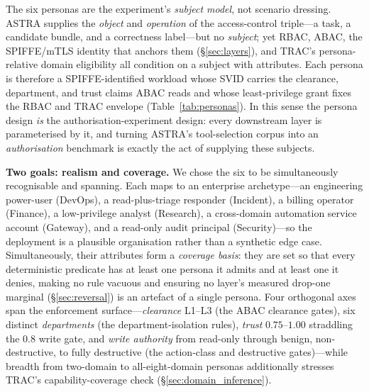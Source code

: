 \documentclass[sigconf,review,anonymous]{acmart}
\begin{document}
The six personas are the experiment's \emph{subject model}, not scenario dressing. ASTRA supplies the \emph{object} and \emph{operation} of the access-control triple---a task, a candidate bundle, and a correctness label---but no \emph{subject}; yet RBAC, ABAC, the SPIFFE/mTLS identity that anchors them (\S\ref{sec:layers}), and TRAC's persona-relative domain eligibility all condition on a subject with attributes. Each persona is therefore a SPIFFE-identified workload whose SVID carries the clearance, department, and trust claims ABAC reads and whose least-privilege grant fixes the RBAC and TRAC envelope (Table~\ref{tab:personas}). In this sense the persona design \emph{is} the authorisation-experiment design: every downstream layer is parameterised by it, and turning ASTRA's tool-selection corpus into an \emph{authorisation} benchmark is exactly the act of supplying these subjects.

\textbf{Two goals: realism and coverage.} We chose the six to be simultaneously recognisable and spanning. Each maps to an enterprise archetype---an engineering power-user (DevOps), a read-plus-triage responder (Incident), a billing operator (Finance), a low-privilege analyst (Research), a cross-domain automation service account (Gateway), and a read-only audit principal (Security)---so the deployment is a plausible organisation rather than a synthetic edge case. Simultaneously, their attributes form a \emph{coverage basis}: they are set so that every deterministic predicate has at least one persona it admits and at least one it denies, making no rule vacuous and ensuring no layer's measured drop-one marginal (\S\ref{sec:reversal}) is an artefact of a single persona. Four orthogonal axes span the enforcement surface---\emph{clearance} L1--L3 (the ABAC clearance gates), six distinct \emph{departments} (the department-isolation rules), \emph{trust} $0.75$--$1.00$ straddling the $0.8$ write gate, and \emph{write authority} from read-only through benign, non-destructive, to fully destructive (the action-class and destructive gates)---while breadth from two-domain to all-eight-domain personas additionally stresses TRAC's capability-coverage check (\S\ref{sec:domain_inference}).
\end{document}
